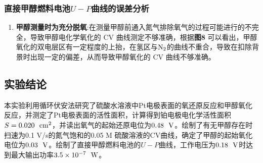 \documentclass[12pt]{article}
\begin{document}
		\subsubsection{直接甲醇燃料电池$U-P$曲线的误差分析}
		\begin{enumerate}
			\item \textbf{甲醇测量时为充分脱氧}:在测量甲醇前通入氮气排除氧气的过程可能进行的不完全，导致甲醇电化学氧化的 CV 曲线测定不够准确，根据\textbf{图8} 可以看出，甲醇氧化的双电层区有一定程度的上抬，在氢区与${\rm N_{2}}$的曲线不重合，导致在扣除背景时出现一定的偏差，从而导致甲醇氧化的 CV 曲线不够准确。
		\end{enumerate}
	
 		\subsection{实验结论}
		 本实验利用循环伏安法研究了硫酸水溶液中Pt电极表面的氧还原反应和甲醇氧化反应，并测定了Pt电极表面的活性面积，计算得到铂电极电化学活性面积$S=0.020\ \ {\rm cm^{2}}$，并读出氧气的起始还原电位为$0.48\ \ {\rm V}$。绘制了有无甲醇存在时扫速为0.1 V/s的氮气饱和的0.05 M 硫酸溶液的CV曲线，确定了甲醇的起始氧化电位为$0.03\ \ {\rm V}$。绘制了直接甲醇燃料电池的$U-P$曲线，工作电压为$0.18\ \ {\rm V}$时达到最大输出功率$3.5\times 10^{-7}\ \ {\rm W}$。
		 

\vbox{}  


\end{document}

